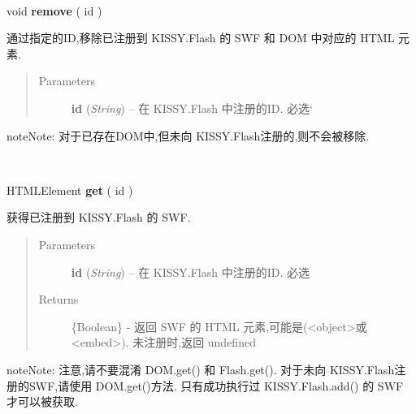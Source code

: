 \documentclass[letterpaper,10pt,english]{sphinxmanual}
\begin{document}
\begin{fulllineitems}
\label{api/component/flash/flash-embed:flash.remove}~
\begin{DUlineblock}{0em}
\item[] void \textbf{remove} ( id )
\item[] 通过指定的ID,移除已注册到 KISSY.Flash 的 SWF 和 DOM 中对应的 HTML 元素.
\end{DUlineblock}
\begin{quote}\begin{description}
\item[{Parameters}] \leavevmode
\textbf{id} (\emph{String}) -- 在 KISSY.Flash 中注册的ID.  必选{}`

\end{description}\end{quote}

\begin{notice}{note}{Note:}
对于已存在DOM中,但未向 KISSY.Flash注册的,则不会被移除.
\end{notice}

\end{fulllineitems}



\begin{fulllineitems}
\label{api/component/flash/flash-embed:flash.get}~
\begin{DUlineblock}{0em}
\item[] HTMLElement \textbf{get} ( id )
\item[] 获得已注册到 KISSY.Flash 的 SWF.
\end{DUlineblock}
\begin{quote}\begin{description}
\item[{Parameters}] \leavevmode
\textbf{id} (\emph{String}) -- 在 KISSY.Flash 中注册的ID.  必选

\item[{Returns}] \leavevmode
\{Boolean\} - 返回 SWF 的 HTML 元素,可能是(\textless{}object\textgreater{}或\textless{}embed\textgreater{}).  未注册时,返回 undefined

\end{description}\end{quote}

\begin{notice}{note}{Note:}
注意,请不要混淆 DOM.get() 和 Flash.get().
对于未向 KISSY.Flash注册的SWF,请使用 DOM.get()方法.
只有成功执行过 KISSY.Flash.add() 的 SWF 才可以被获取.
\end{notice}

\end{fulllineitems}
\end{document}
